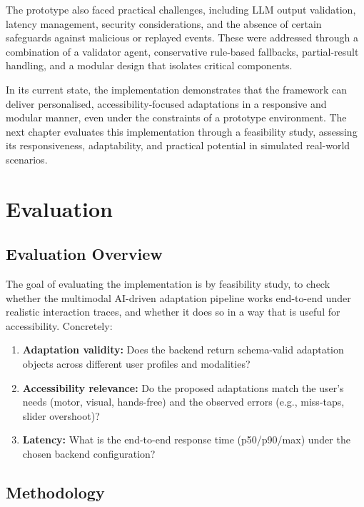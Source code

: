 \documentclass[openany]{book}
\begin{document}
The prototype also faced practical challenges, including LLM output validation, latency management, security considerations, and the absence of certain safeguards against malicious or replayed events. These were addressed through a combination of a validator agent, conservative rule-based fallbacks, partial-result handling, and a modular design that isolates critical components.

In its current state, the implementation demonstrates that the framework can deliver personalised, accessibility-focused adaptations in a responsive and modular manner, even under the constraints of a prototype environment. The next chapter evaluates this implementation through a feasibility study, assessing its responsiveness, adaptability, and practical potential in simulated real-world scenarios.

\chapter{Evaluation}

\section{Evaluation Overview}
The goal of evaluating the implementation is by feasibility study, to check whether the multimodal AI-driven adaptation pipeline works end-to-end under realistic interaction traces, and whether it does so in a way that is useful for accessibility. Concretely:
\begin{enumerate}
    \item \textbf{Adaptation validity:} Does the backend return schema-valid adaptation objects across different user profiles and modalities?
    \item \textbf{Accessibility relevance:} Do the proposed adaptations match the user’s needs (motor, visual, hands-free) and the observed errors (e.g., miss-taps, slider overshoot)?
    \item \textbf{Latency:} What is the end-to-end response time (p50/p90/max) under the chosen backend configuration?
\end{enumerate}

\section{Methodology}
\end{document}

